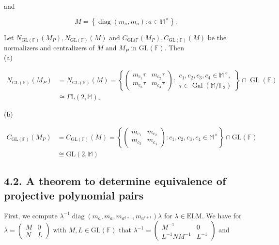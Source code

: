 \documentclass[10pt]{article}
\begin{document}
and

$$
M=\left\{\operatorname{diag}\left(m_{a}, m_{a}\right): a \in \mathbb{M}^{\times}\right\} .
$$

Let $N_{\mathrm{GL}(\mathbb{F})}\left(M_{P}\right), N_{\mathrm{GL}(\mathbb{F})}(M)$ and $C_{\mathrm{GL}(\mathbb{F}}\left(M_{P}\right), C_{\mathrm{GL}(\mathbb{F})}(M)$ be the normalizers and centralizers of $M$ and $M_{P}$ in $\mathrm{GL}(\mathbb{F})$. Then\\
(a)

$$
\begin{aligned}
N_{\mathrm{GL}(\mathbb{F})}\left(M_{P}\right) & =N_{\mathrm{GL}(\mathbb{F})}(M)=\left\{\left(\begin{array}{ll}
m_{c_{1}} \tau & m_{c_{2}} \tau \\
m_{c_{3}} \tau & m_{c_{4}} \tau
\end{array}\right): \begin{array}{l}
c_{1}, c_{2}, c_{3}, c_{4} \in \mathbb{M}^{\times}, \\
\tau \in \operatorname{Gal}\left(\mathbb{M} / \mathbb{F}_{2}\right)
\end{array}\right\} \cap \operatorname{GL}(\mathbb{F}) \\
& \cong \Gamma \mathrm{L}(2, \mathbb{M}),
\end{aligned}
$$

(b)

$$
\begin{aligned}
C_{\mathrm{GL}(\mathbb{F})}\left(M_{P}\right) & =C_{\mathrm{GL}(\mathbb{F})}(M)=\left\{\left(\begin{array}{ll}
m_{c_{1}} & m_{c_{2}} \\
m_{c_{3}} & m_{c_{4}}
\end{array}\right): c_{1}, c_{2}, c_{3}, c_{4} \in \mathbb{M}^{\times}\right\} \cap \mathrm{GL}(\mathbb{F}) \\
& \cong \mathrm{GL}(2, \mathbb{M})
\end{aligned}
$$

\subsection*{4.2. A theorem to determine equivalence of projective polynomial pairs}
First, we compute $\lambda^{-1} \operatorname{diag}\left(m_{a}, m_{a}, m_{a^{q+1}}, m_{a^{r+1}}\right) \lambda$ for $\lambda \in \mathrm{ELM}$. We have for $\lambda=\left(\begin{array}{cc}M & 0 \\ N & L\end{array}\right)$ with $M, L \in \mathrm{GL}(\mathbb{F})$ that $\lambda^{-1}=\left(\begin{array}{cc}M^{-1} & 0 \\ L^{-1} N M^{-1} & L^{-1}\end{array}\right)$ and
\end{document}
